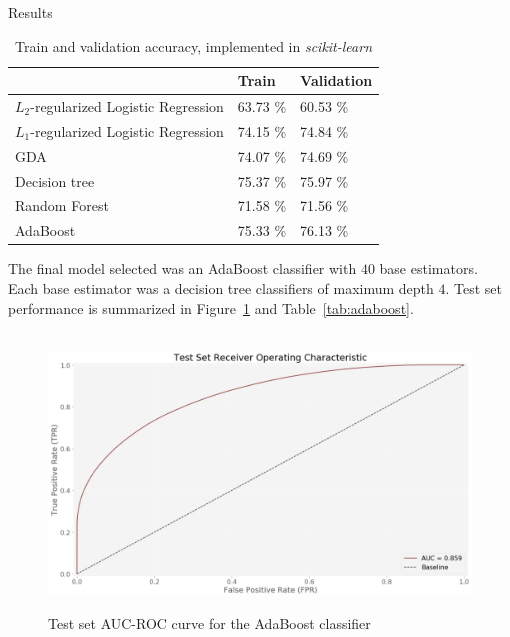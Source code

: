 \documentclass[final]{beamer}
\newlength{\thirdcolwid}
\begin{document}
\begin{frame}[t]
\begin{columns}[t]
\begin{column}[t]{\thirdcolwid}
\begin{block}{Results}
    \begin{table}[]
    \centering
    \caption{Train and validation accuracy, implemented in \textit{scikit-learn} \cite{sklearn}}
    \label{tab:results}
    \begin{tabular}{lll}
        \hline
                                                & Train    & Validation \\ \hline
        $L_{2}$-regularized Logistic Regression & 63.73 \% & 60.53 \%   \\
        $L_{1}$-regularized Logistic Regression & 74.15 \% & 74.84 \%   \\
        GDA                                     & 74.07 \% & 74.69 \%   \\
        Decision tree                           & 75.37 \% & 75.97 \%   \\
        Random Forest                           & 71.58 \% & 71.56 \%   \\
        AdaBoost                                & 75.33 \% & 76.13 \%   \\ \hline
    \end{tabular}
    \end{table}
    \vspace{1.2em}
    The final model selected was an AdaBoost classifier with $40$ base estimators. Each base estimator was a decision tree classifiers of maximum depth $4$. Test set performance is summarized in Figure~\ref{fig:roc} and Table~\ref{tab:adaboost}.
    \vspace{1.2em}
    \begin{figure}
        \hbox{\hspace{-1em}
        \includegraphics[width=1.05\thirdcolwid]{./img/roc.png}}
        \caption{Test set AUC-ROC curve for the AdaBoost classifier}
        \label{fig:roc}
    \end{figure}
    

\end{block}
\end{column}
\end{columns}
\end{frame}
\end{document}
